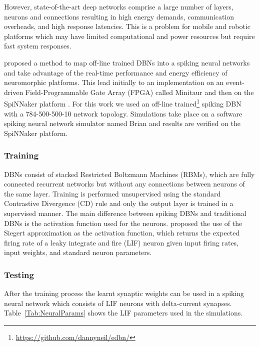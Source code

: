 However, state-of-the-art deep networks comprise a large number of layers, neurons and connections resulting in high energy demands, communication overheads, and high response latencies. This is a problem for mobile and robotic platforms which may have limited computational and power resources but require fast system responses. 


\citet{10.3389/fnins.2013.00178} proposed a method to map off-line trained DBNs into a spiking neural networks and take advantage of the real-time performance and energy efficiency of neuromorphic platforms. This lead initially to an implementation on an event-driven Field-Programmable Gate Array (FPGA) called Minitaur \citep{dannminitaur} and then on the SpiNNaker platform \citep{iscasSpinnakerAcceptedDemo,SpinnakerDBN2015}. For this work we used an off-line trained\footnote{\url{https://github.com/dannyneil/edbn/}} spiking DBN with a 784-500-500-10 network topology. Simulations take place on a software spiking neural network simulator named Brian \citep{briansim} and results are verified on the SpiNNaker platform.

\subsubsection{Training}

DBNs consist of stacked Restricted Boltzmann Machines (RBMs), which are fully connected recurrent networks but without any connections between neurons of the same layer. Training is performed unsupervised using the standard Contrastive Divergence (CD) rule \citep{Hinton_Contr_Divergence2006} and only the output layer is trained in a supervised manner. The main difference between spiking DBNs and traditional DBNs is the activation function used for the neurons. \citet{10.3389/fnins.2013.00178} proposed the use of the Siegert approximation \citep{Jug_etal_2012} as the activation function, which returns the expected firing rate of a leaky integrate and fire (LIF) neuron given input firing rates, input weights, and standard neuron parameters.

\subsubsection{Testing}
After the training process the learnt synaptic weights can be used in a spiking neural network which consists of LIF neurons with delta-current synapses. Table~\ref{Tab:NeuralParams} shows the LIF parameters used in the simulations.

